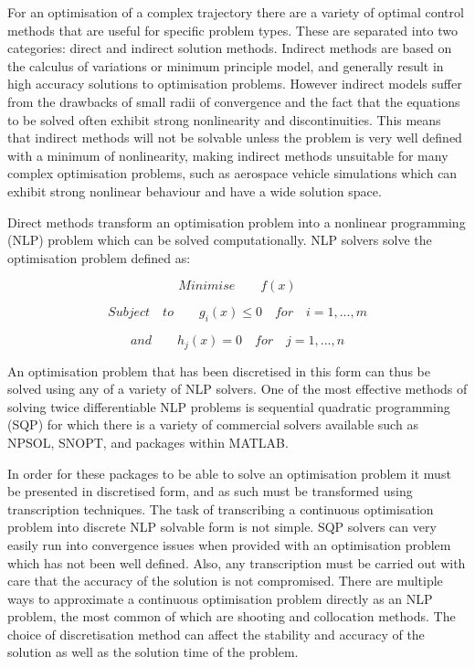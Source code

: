 For an optimisation of a complex trajectory there are a variety of optimal control methods that are useful for specific problem types. These are separated into two categories: direct and indirect solution methods\cite{Betts1998}. Indirect methods are based on the calculus of variations or minimum principle model, and generally result in high accuracy solutions to optimisation problems\cite{Bulirsch1993}. However indirect models suffer from the drawbacks of small radii of convergence and the fact that the equations to be solved often exhibit strong nonlinearity and discontinuities. This means that indirect methods will not be solvable unless the problem is very well defined with a minimum of nonlinearity, making indirect methods unsuitable for many complex optimisation problems, such as aerospace vehicle simulations which can exhibit strong nonlinear behaviour and have a wide solution space. 

Direct methods transform an optimisation problem into a nonlinear programming (NLP) problem which can be solved computationally\cite{Stryk1992}. NLP solvers solve the optimisation problem defined as\cite{Bazaraa2013}:

\begin{equation}
Minimise \qquad f(x)
\end{equation}

\begin{equation}
Subject \quad to \qquad g_i(x)\leq0 \quad for \quad i=1,...,m
\end{equation}

\begin{equation}
and \qquad h_j(x) = 0 \quad for \quad j=1,...,n
\end{equation}

An optimisation problem that has been discretised in this form can thus be solved using any of a variety of NLP solvers. One of the most effective methods of solving twice differentiable NLP problems is sequential quadratic programming (SQP)\cite{Boggs2000} for which there is a variety of commercial solvers available such as NPSOL, SNOPT, and packages within MATLAB. 

In order for these packages to be able to solve an optimisation problem it must be presented in discretised form, and as such must be transformed using transcription techniques\cite{Kelly2015}. The task of transcribing a continuous optimisation problem into discrete NLP solvable form is not simple. SQP solvers can very easily run into convergence issues when provided with an optimisation problem which has not been well defined. Also, any transcription must be carried out with care that the accuracy of the solution is not compromised. 
There are multiple ways to approximate a continuous optimisation problem directly as an NLP problem, the most common of which are shooting and collocation methods. The choice of discretisation method can affect the stability and accuracy of the solution as well as the solution time of the problem. 

